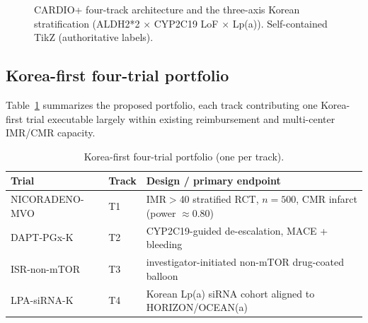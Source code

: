 \documentclass[11pt]{article}
\begin{document}
\begin{figure}[h]
\centering
{}
\caption{CARDIO+ four-track architecture and the three-axis Korean stratification (ALDH2*2 $\times$ CYP2C19 LoF $\times$ Lp(a)). Self-contained TikZ (authoritative labels).}
\label{fig:overview}
\end{figure}

\subsection{Korea-first four-trial portfolio}
Table~\ref{tab:trials} summarizes the proposed portfolio, each track contributing one Korea-first trial executable largely within existing reimbursement and multi-center IMR/CMR capacity.

\begin{table}[h]
\centering
\caption{Korea-first four-trial portfolio (one per track).}
\label{tab:trials}
\begin{tabular}{lll}
\toprule
Trial & Track & Design / primary endpoint \\
\midrule
NICORADENO-MVO & T1 & IMR$>$40 stratified RCT, $n{=}500$, CMR infarct (power $\approx$0.80) \\
DAPT-PGx-K     & T2 & CYP2C19-guided de-escalation, MACE + bleeding \\
ISR-non-mTOR   & T3 & investigator-initiated non-mTOR drug-coated balloon \\
LPA-siRNA-K    & T4 & Korean Lp(a) siRNA cohort aligned to HORIZON/OCEAN(a) \\
\bottomrule
\end{tabular}
\end{table}
\end{document}
